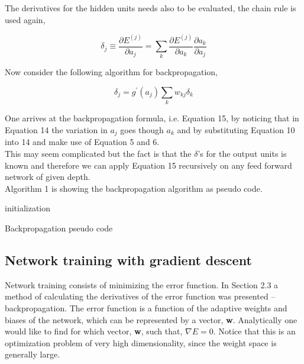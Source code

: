 \documentclass[11pt, letterpaper]{amsart}
\begin{document}
The derivatives for the hidden units needs also to be evaluated, the chain rule is used again,

\begin{equation}
    \delta_j \equiv \frac{\partial E^{(j)}}{\partial a_j} = \sum_k \frac{\partial E^{(j)}}{\partial a_k} \frac{\partial a_k}{\partial a_j}
\end{equation}

Now consider the following algorithm for backpropagation,

\begin{equation}
    \delta_j = g^\prime (a_j) \sum_k w_{kj} \delta_k
\end{equation}

One arrives at the backpropagation formula, i.e. Equation 15, by noticing that in Equation 14 the variation in $a_j$ goes though $a_k$ and by substituting Equation 10 into 14 and make use of Equation 5 and 6.
\\

This may seem complicated but the fact is that the $\delta$'s for the output units is known and therefore we can apply Equation 15 recursively on any feed forward network of given depth.
\\

Algorithm 1 is showing the backpropagation algorithm as pseudo code.
\\

\begin{algorithm}[H]
 initialization\;
 \caption{Backpropagation pseudo code}
\end{algorithm}


\subsection{Network training with gradient descent}
Network training consists of minimizing the error function. In Section 2.3 a method of calculating the derivatives of the error function was presented – backpropagation. The error function is a function of the adaptive weights and biases of the network, which can be represented by a vector, \textbf{w}. Analytically one would like to find for which vector, \textbf{w}, such that, $\nabla E = 0$. Notice that this is an optimization problem of very high dimensionality, since the weight space is generally large.
\\
\end{document}
